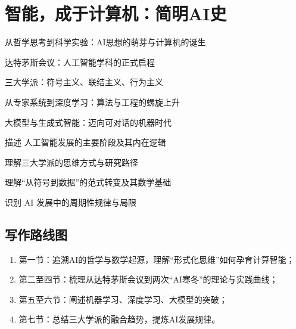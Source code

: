 \chapter{智能，成于计算机：简明AI史}




\begin{introduction}  
  \item 从哲学思考到科学实验：AI思想的萌芽与计算机的诞生
  \item 达特茅斯会议：人工智能学科的正式启程
  \item 三大学派：符号主义、联结主义、行为主义
  \item 从专家系统到深度学习：算法与工程的螺旋上升
  \item 大模型与生成式智能：迈向可对话的机器时代
\end{introduction}

\begin{introduction}
  \item 描述 人工智能发展的主要阶段及其内在逻辑
  \item 理解三大学派的思维方式与研究路径
  \item 理解“从符号到数据”的范式转变及其数学基础
  \item 识别 AI 发展中的周期性规律与局限
\end{introduction}

\section*{写作路线图}
\begin{enumerate}
  \item 第一节：追溯AI的哲学与数学起源，理解“形式化思维”如何孕育计算智能；
  \item 第二至四节：梳理从达特茅斯会议到两次“AI寒冬”的理论与实践曲线；
  \item 第五至六节：阐述机器学习、深度学习、大模型的突破；
  \item 第七节：总结三大学派的融合趋势，提炼AI发展规律。
\end{enumerate}

